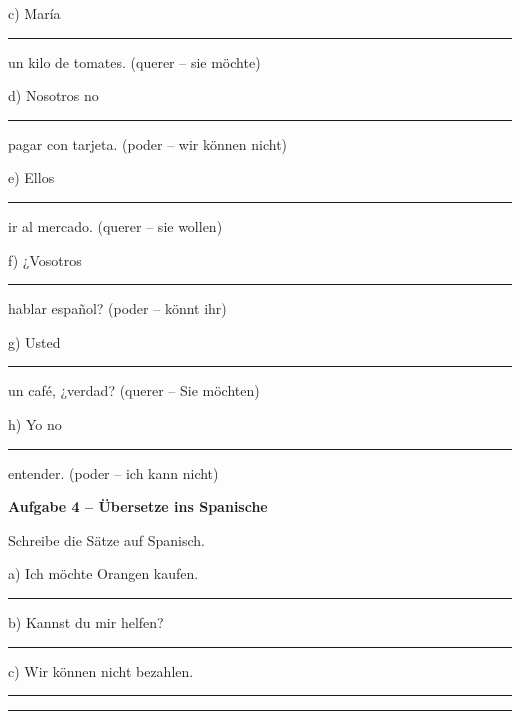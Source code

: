 \documentclass[11pt, a4paper]{article}
\newcommand{\fachfarbe}{spanisch}
\newcommand{\punktebox}[1]{\hfill\fbox{\small \_/#1}}
\newcommand{\luecke}[1]{\rule{#1}{0.4pt}}
\newenvironment{aufgabe}[1]{%
    \needspace{5\baselineskip}%
    \nopagebreak[4]%
    \vspace{10pt}
    \noindent\textbf{\textcolor{\fachfarbe}{Aufgabe #1}}
    \nopagebreak[4]%
    \vspace{5pt}
    \nopagebreak[4]%
    \begin{list}{}{\leftmargin=0pt}
    \item[]
}{%
    \end{list}
}
\begin{document}
\noindent
c) María \luecke{2.5cm} un kilo de tomates. \hfill (querer -- sie möchte)

\vspace{0.8em}

\noindent
d) Nosotros no \luecke{2.5cm} pagar con tarjeta. \hfill (poder -- wir können nicht)

\vspace{0.8em}

\noindent
e) Ellos \luecke{2.5cm} ir al mercado. \hfill (querer -- sie wollen)

\vspace{0.8em}

\noindent
f) ¿Vosotros \luecke{2.5cm} hablar español? \hfill (poder -- könnt ihr)

\vspace{0.8em}

\noindent
g) Usted \luecke{2.5cm} un café, ¿verdad? \hfill (querer -- Sie möchten)

\vspace{0.8em}

\noindent
h) Yo no \luecke{2.5cm} entender. \hfill (poder -- ich kann nicht)

\vspace{15pt}


\begin{aufgabe}{4 -- Übersetze ins Spanische}
Schreibe die Sätze auf Spanisch. \punktebox{6}
\end{aufgabe}

\noindent
a) Ich möchte Orangen kaufen.

\luecke{10cm}

\vspace{1em}

\noindent
b) Kannst du mir helfen?

\luecke{10cm}

\vspace{1em}

\noindent
c) Wir können nicht bezahlen.

\luecke{10cm}


\vspace{25pt}
\hrule
\vspace{10pt}
\end{document}
